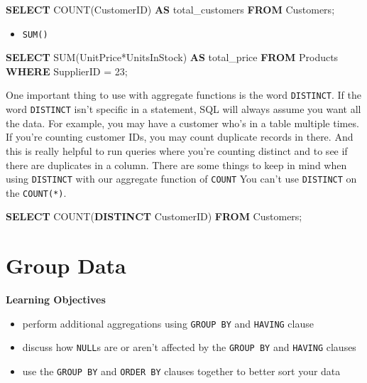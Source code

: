 \documentclass[]{book}
\makeatletter
\newenvironment{Shaded}{\begin{snugshade}}{\end{snugshade}}
\newcommand{\KeywordTok}[1]{\textcolor[rgb]{0.13,0.29,0.53}{\textbf{{#1}}}}
\newcommand{\DecValTok}[1]{\textcolor[rgb]{0.00,0.00,0.81}{{#1}}}
\newcommand{\FunctionTok}[1]{\textcolor[rgb]{0.00,0.00,0.00}{{#1}}}
\newcommand{\NormalTok}[1]{{#1}}
\providecommand{\tightlist}{%
  \setlength{\itemsep}{0pt}\setlength{\parskip}{0pt}}
\newenvironment{kframe}{%
\medskip{}
\setlength{\fboxsep}{.8em}
 \def\at@end@of@kframe{}%
 \ifinner\ifhmode%
  \def\at@end@of@kframe{\end{minipage}}%
  \begin{minipage}{\columnwidth}%
 \fi\fi%
 \def\FrameCommand##1{\hskip\@totalleftmargin \hskip-\fboxsep
 \colorbox{shadecolor}{##1}\hskip-\fboxsep
     \hskip-\linewidth \hskip-\@totalleftmargin \hskip\columnwidth}%
 \MakeFramed {\advance\hsize-\width
   \@totalleftmargin\z@ \linewidth\hsize
   \@setminipage}}%
 {\par\unskip\endMakeFramed%
 \at@end@of@kframe}
\renewenvironment{Shaded}{\begin{kframe}}{\end{kframe}}
\theoremstyle{definition}
\theoremstyle{definition}
\theoremstyle{remark}
\makeatother
\begin{document}
\begin{Shaded}
\begin{Highlighting}[]
\KeywordTok{SELECT} \FunctionTok{COUNT}\NormalTok{(CustomerID) }\KeywordTok{AS} \NormalTok{total_customers}
\KeywordTok{FROM} \NormalTok{Customers;}
\end{Highlighting}
\end{Shaded}

\begin{itemize}
\tightlist
\item
  \texttt{SUM()}
\end{itemize}

\begin{Shaded}
\begin{Highlighting}[]
\KeywordTok{SELECT} \FunctionTok{SUM}\NormalTok{(UnitPrice*UnitsInStock) }\KeywordTok{AS} \NormalTok{total_price}
\KeywordTok{FROM} \NormalTok{Products}
\KeywordTok{WHERE} \NormalTok{SupplierID = }\DecValTok{23}\NormalTok{;}
\end{Highlighting}
\end{Shaded}

One important thing to use with aggregate functions is the word
\texttt{DISTINCT}. If the word \texttt{DISTINCT} isn't specific in a
statement, SQL will always assume you want all the data. For example,
you may have a customer who's in a table multiple times. If you're
counting customer IDs, you may count duplicate records in there. And
this is really helpful to run queries where you're counting distinct and
to see if there are duplicates in a column. There are some things to
keep in mind when using \texttt{DISTINCT} with our aggregate function of
\texttt{COUNT} You can't use \texttt{DISTINCT} on the \texttt{COUNT(*)}.

\begin{Shaded}
\begin{Highlighting}[]
\KeywordTok{SELECT} \FunctionTok{COUNT}\NormalTok{(}\KeywordTok{DISTINCT} \NormalTok{CustomerID)}
\KeywordTok{FROM} \NormalTok{Customers;}
\end{Highlighting}
\end{Shaded}

\section{Group Data}\label{group-data}

\textbf{Learning Objectives}

\begin{itemize}
\tightlist
\item
  perform additional aggregations using \texttt{GROUP\ BY} and
  \texttt{HAVING} clause
\item
  discuss how \texttt{NULL}s are or aren't affected by the
  \texttt{GROUP\ BY} and \texttt{HAVING} clauses
\item
  use the \texttt{GROUP\ BY} and \texttt{ORDER\ BY} clauses together to
  better sort your data
\end{itemize}
\end{document}
